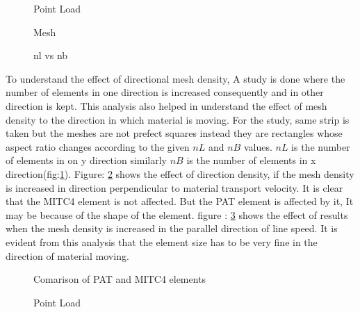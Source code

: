 \documentclass[main.tex]{subfiles}
\begin{document}
\begin{figure}[h]
\centering

\caption{Point Load}
\label{fig:Mesh_Density_NbvsNl}
\end{figure}
\begin{figure}[h]
\centering

\caption{Mesh}
\label{fig:Strip_nlvsnb_nb}
\end{figure}
\begin{figure}[h!]

\caption{nl vs nb}
\label{fig:Strip_nlvsnb_nl}
\end{figure}

To understand the effect of directional mesh density, A study is done where the number of elements in one direction is increased consequently and in other direction is kept. This analysis also helped in understand the effect of mesh density to the direction in which material is moving. For the study, same strip is taken but the meshes are not prefect squares instead they are rectangles whose aspect ratio changes according to the given $nL$ and $nB$ values. $nL$ is the number of elements in on y direction similarly $nB$ is the number of elements in x direction(fig:\ref{fig:Mesh_Density_NbvsNl}). Figure: \ref{fig:Strip_nlvsnb_nb} shows the effect of direction density, if the mesh density is increased in direction perpendicular to material transport velocity. It is clear that the MITC4 element is not affected. But the PAT element is affected by it, It may be because of the shape of the element. figure : \ref{fig:Strip_nlvsnb_nl} shows the effect of results when the mesh density is increased in the parallel direction of line speed. It is evident from this analysis that the element size has to be very fine in the direction of material moving. 

\begin{figure}[h!]

\caption{Comarison of PAT and MITC4 elements}
\label{fig:Strip_SR}
\end{figure}

\begin{figure}[h]
\centering

\caption{Point Load}
\label{fig:Strip_load_SR}
\end{figure}
\end{document}
